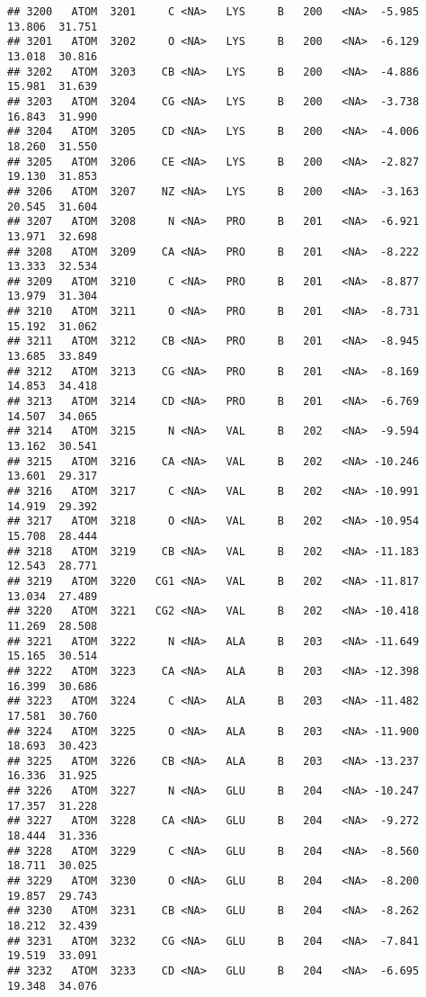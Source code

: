 \documentclass[
]{article}
\begin{document}
\begin{verbatim}
## 3200   ATOM  3201     C <NA>   LYS     B   200   <NA>  -5.985  13.806  31.751
## 3201   ATOM  3202     O <NA>   LYS     B   200   <NA>  -6.129  13.018  30.816
## 3202   ATOM  3203    CB <NA>   LYS     B   200   <NA>  -4.886  15.981  31.639
## 3203   ATOM  3204    CG <NA>   LYS     B   200   <NA>  -3.738  16.843  31.990
## 3204   ATOM  3205    CD <NA>   LYS     B   200   <NA>  -4.006  18.260  31.550
## 3205   ATOM  3206    CE <NA>   LYS     B   200   <NA>  -2.827  19.130  31.853
## 3206   ATOM  3207    NZ <NA>   LYS     B   200   <NA>  -3.163  20.545  31.604
## 3207   ATOM  3208     N <NA>   PRO     B   201   <NA>  -6.921  13.971  32.698
## 3208   ATOM  3209    CA <NA>   PRO     B   201   <NA>  -8.222  13.333  32.534
## 3209   ATOM  3210     C <NA>   PRO     B   201   <NA>  -8.877  13.979  31.304
## 3210   ATOM  3211     O <NA>   PRO     B   201   <NA>  -8.731  15.192  31.062
## 3211   ATOM  3212    CB <NA>   PRO     B   201   <NA>  -8.945  13.685  33.849
## 3212   ATOM  3213    CG <NA>   PRO     B   201   <NA>  -8.169  14.853  34.418
## 3213   ATOM  3214    CD <NA>   PRO     B   201   <NA>  -6.769  14.507  34.065
## 3214   ATOM  3215     N <NA>   VAL     B   202   <NA>  -9.594  13.162  30.541
## 3215   ATOM  3216    CA <NA>   VAL     B   202   <NA> -10.246  13.601  29.317
## 3216   ATOM  3217     C <NA>   VAL     B   202   <NA> -10.991  14.919  29.392
## 3217   ATOM  3218     O <NA>   VAL     B   202   <NA> -10.954  15.708  28.444
## 3218   ATOM  3219    CB <NA>   VAL     B   202   <NA> -11.183  12.543  28.771
## 3219   ATOM  3220   CG1 <NA>   VAL     B   202   <NA> -11.817  13.034  27.489
## 3220   ATOM  3221   CG2 <NA>   VAL     B   202   <NA> -10.418  11.269  28.508
## 3221   ATOM  3222     N <NA>   ALA     B   203   <NA> -11.649  15.165  30.514
## 3222   ATOM  3223    CA <NA>   ALA     B   203   <NA> -12.398  16.399  30.686
## 3223   ATOM  3224     C <NA>   ALA     B   203   <NA> -11.482  17.581  30.760
## 3224   ATOM  3225     O <NA>   ALA     B   203   <NA> -11.900  18.693  30.423
## 3225   ATOM  3226    CB <NA>   ALA     B   203   <NA> -13.237  16.336  31.925
## 3226   ATOM  3227     N <NA>   GLU     B   204   <NA> -10.247  17.357  31.228
## 3227   ATOM  3228    CA <NA>   GLU     B   204   <NA>  -9.272  18.444  31.336
## 3228   ATOM  3229     C <NA>   GLU     B   204   <NA>  -8.560  18.711  30.025
## 3229   ATOM  3230     O <NA>   GLU     B   204   <NA>  -8.200  19.857  29.743
## 3230   ATOM  3231    CB <NA>   GLU     B   204   <NA>  -8.262  18.212  32.439
## 3231   ATOM  3232    CG <NA>   GLU     B   204   <NA>  -7.841  19.519  33.091
## 3232   ATOM  3233    CD <NA>   GLU     B   204   <NA>  -6.695  19.348  34.076

\end{verbatim}
\end{document}
